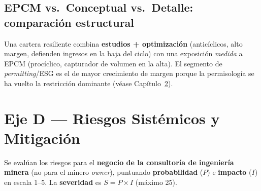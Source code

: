 \documentclass[11pt,letterpaper]{report}
\begin{document}
\section{EPCM vs.\ Conceptual vs.\ Detalle: comparación estructural}
\begin{table}[htbp]
\centering
\caption{Comparación estructural por tipo de servicio.}
\label{tab:servicios}
\footnotesize
\renewcommand{\arraystretch}{1.3}
\end{table}

\begin{cajahallazgo}
Una cartera resiliente combina \textbf{estudios + optimización} (anticíclicos, alto margen, defienden ingresos en la baja del
ciclo) con una exposición \emph{medida} a EPCM (procíclico, capturador de volumen en la alta). El segmento de
\emph{permitting}/ESG es el de mayor crecimiento de margen porque la permisología se ha vuelto la restricción dominante
(véase Capítulo~\ref{cap:riesgos}).
\end{cajahallazgo}

\chapter{Eje D --- Riesgos Sistémicos y Mitigación}
\label{cap:riesgos}
Se evalúan los riesgos para el \textbf{negocio de la consultoría de ingeniería minera} (no para el minero \emph{owner}), puntuando
\textbf{probabilidad} ($P$) e \textbf{impacto} ($I$) en escala 1--5. La \textbf{severidad} es $S = P \times I$ (máximo 25).
\end{document}
